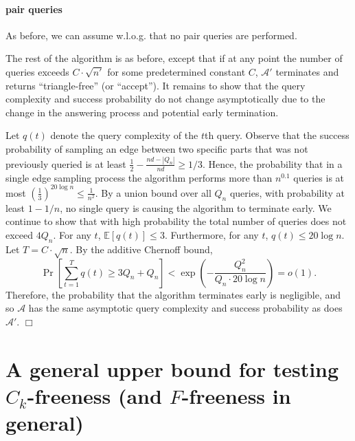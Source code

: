 \documentclass{article}
\newcommand{\Ex}{\mathbb{E}}
\newcommand{\calA}{{\mathcal{A}}}
\newcommand{\mA}{{\mathcal{A}}}
\newcommand{\trn}{{n'}}
\newcommand{\trA}{{\calA'}}
\newenvironment{proofof}[1]{\smallskip\noindent{\bf Proof of #1:}}%
        {\hspace*{\fill}$\Box$\par}
\newcommand{\commentt}[1]{ {}}
\begin{document}
\begin{proofof}{Theorem~\ref{thm:lb_ck_const_alpha}}
\paragraph{pair queries} As before, we can assume w.l.o.g. that no pair queries are performed.

The rest of the algorithm is as before, except that if at any point the number of queries exceeds $C\cdot \sqrt{\trn}$ for some predetermined constant $C$, $\trA$ terminates and returns 
``triangle-free'' (or ``accept''). It remains to show that the query complexity and success probability do not change asymptotically due to the change in the answering process and potential early termination.

Let $q(t)$ denote the query complexity 
of the $t$th query. \commentt{DR: maybe clarify: the number of queries performed by $\mA$ on $G$ given the $t$th query of $\mA'$}
Observe that the success probability  of sampling an edge   between two specific parts that was not previously queried is at least $\frac{1}{2}-\frac{nd-|Q_n|}{nd}\geq 1/3$. \commentt{something here is a bit confusing with singular and plural}
Hence, 
the probability that in a single edge sampling process the algorithm performs more than $n^{0.1}$ queries is at most $(\frac{1}{3})^{20\log n}\leq \frac{1}{n^2}$.
By a union bound over all $Q_n$ queries, \commentt{of $\mA'$, right?}  with probability at least $1-1/n$, no single query is causing the algorithm to terminate early. We continue to show that with high probability the total  number of queries \commentt{performed by $\mA$} does not exceed $4Q_n$.
For any $t$,  $\Ex[q(t)]\leq 3$. 
Furthermore, for any $t$, $q(t)\leq 20\log n.$ 
Let $T=C\cdot \sqrt n$. By the additive Chernoff bound,
\[
 \Pr\left[\sum_{t=1}^{T} q(t)\geq 3Q_n+Q_n \right] < \exp\left( -\frac{Q_n^2}{Q_n\cdot 20\log n} \right)=o(1).
\]
Therefore, the probability that the algorithm terminates early is negligible, and so $\mA$ has the same asymptotic query complexity and success probability as does $\mA'$.
\fi
%
\end{proofof}





%
\section{A general upper bound for testing $C_k$-freeness (and $F$-freeness in general)}\label{sec:Ck}
\end{document}
